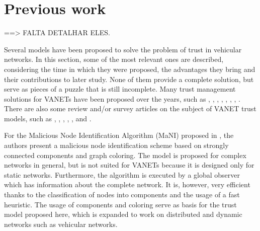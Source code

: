 \documentclass[conference]{IEEEtran}
\begin{document}

\section{Previous work}
\label{section:previouswork}


==> FALTA DETALHAR ELES.

Several models have been proposed to solve the problem of trust in vehicular networks. 
In this section, some of the most relevant ones are described, considering the time in which they were proposed, the advantages they bring and their contributions to later study. 
None of them provide a complete solution, but serve as pieces of a puzzle that is still incomplete. 
Many trust management solutions for VANETs have been proposed over the years, such as \cite{patwardhan2006data}, \cite{gerlach2007trust}, \cite{raya2008data}, \cite{huang2010situation}, \cite{ding2013novel}, \cite{haddadou2013trust}, \cite{liu2016lsot}, \cite{kerrache2016detection}.
There are also some review and/or survey articles on the subject of VANET trust models, such as \cite{zhang2011survey}, \cite{ma2011survey}, \cite{zhang2012trust}, \cite{mejri2014survey}, \cite{soleymani2015trust} \cite{sengar2016survey}, and \cite{dwivedi2016review}.

For the Malicious Node Identification Algorithm (MaNI) proposed in \cite{vernize2015malicious}, the authors present a malicious node identification scheme based on strongly connected components and graph coloring.
The model is proposed for complex networks in general, but is not suited for VANETs because it is designed only for static networks.
Furthermore, the algorithm is executed by a global observer which has information about the complete network.
It is, however, very efficient thanks to the classification of nodes into components and the usage of a fast heuristic.
The usage of components and coloring serve as basis for the trust model proposed here, which is expanded to work on distributed and dynamic networks such as vehicular networks.
\end{document}
